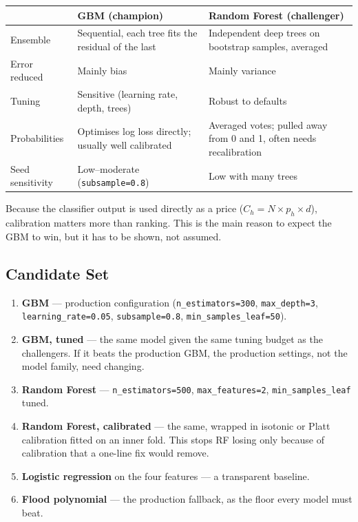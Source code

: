 \documentclass[11pt,a4paper]{article}
\begin{document}
\begin{center}
\begin{tabular}{p{3.2cm}p{5.2cm}p{5.2cm}}
\toprule
& \textbf{GBM (champion)} & \textbf{Random Forest (challenger)} \\
\midrule
Ensemble     & Sequential, each tree fits the residual of the last
             & Independent deep trees on bootstrap samples, averaged \\
Error reduced & Mainly bias & Mainly variance \\
Tuning       & Sensitive (learning rate, depth, trees)
             & Robust to defaults \\
Probabilities & Optimises log loss directly; usually well calibrated
             & Averaged votes; pulled away from 0 and 1, often needs
               recalibration \\
Seed sensitivity & Low--moderate (\texttt{subsample=0.8})
             & Low with many trees \\
\bottomrule
\end{tabular}
\end{center}

\noindent Because the classifier output is used directly as a price
($C_h = N \times p_h \times d$), calibration matters more than
ranking.  This is the main reason to expect the GBM to win, but it has
to be shown, not assumed.

\subsection{Candidate Set}

\begin{enumerate}
  \item \textbf{GBM} --- production configuration
        (\texttt{n\_estimators=300}, \texttt{max\_depth=3},
        \texttt{learning\_rate=0.05}, \texttt{subsample=0.8},
        \texttt{min\_samples\_leaf=50}).
  \item \textbf{GBM, tuned} --- the same model given the same tuning
        budget as the challengers.  If it beats the production GBM,
        the production settings, not the model family, need changing.
  \item \textbf{Random Forest} --- \texttt{n\_estimators=500},
        \texttt{max\_features=2}, \texttt{min\_samples\_leaf} tuned.
  \item \textbf{Random Forest, calibrated} --- the same, wrapped in
        isotonic or Platt calibration fitted on an inner fold.  This
        stops RF losing only because of calibration that a
        one-line fix would remove.
  \item \textbf{Logistic regression} on the four features --- a
        transparent baseline.
  \item \textbf{Flood polynomial} --- the production fallback, as the
        floor every model must beat.
\end{enumerate}
\end{document}
